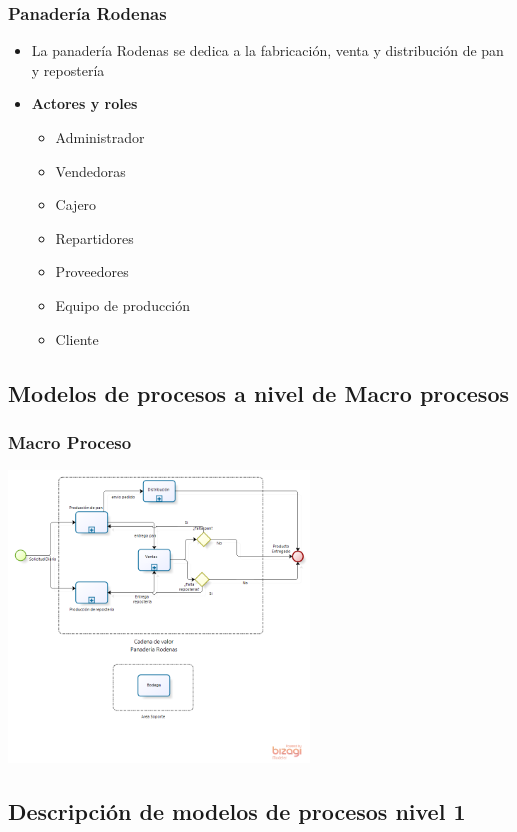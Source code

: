 \documentclass[10pt,letterpaper]{beamer}
\begin{document}
\begin{frame}
\frametitle{Panadería Rodenas}
\begin{itemize}
\item La panadería Rodenas se dedica a la fabricación, venta y distribución de pan y repostería 
\item \textbf{Actores y roles}
\begin{itemize}
\item Administrador
\item Vendedoras
\item Cajero
\item Repartidores
\item Proveedores
\item Equipo de producción
\item Cliente
\end{itemize} 
\end{itemize} 
\end{frame}

\subsection{Modelos de procesos a nivel de Macro procesos}

\begin{frame}
\frametitle{Macro Proceso}
\begin{center}
\includegraphics[width=8cm]{./imagenes/Macro_proceso.png}
\end{center}
\end{frame}

\subsection{Descripción de modelos de procesos nivel 1}
\end{document}
